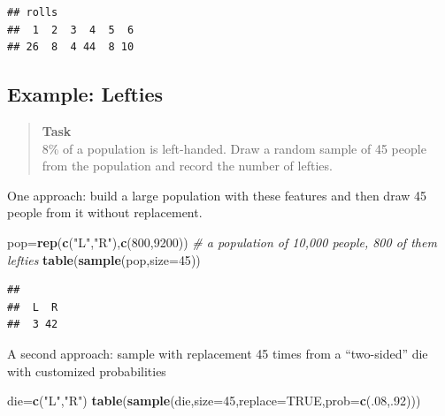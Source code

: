 \documentclass[
]{book}
\newenvironment{Shaded}{\begin{snugshade}}{\end{snugshade}}
\newcommand{\AttributeTok}[1]{\textcolor[rgb]{0.13,0.29,0.53}{#1}}
\newcommand{\CommentTok}[1]{\textcolor[rgb]{0.56,0.35,0.01}{\textit{#1}}}
\newcommand{\ConstantTok}[1]{\textcolor[rgb]{0.56,0.35,0.01}{#1}}
\newcommand{\DecValTok}[1]{\textcolor[rgb]{0.00,0.00,0.81}{#1}}
\newcommand{\FunctionTok}[1]{\textcolor[rgb]{0.13,0.29,0.53}{\textbf{#1}}}
\newcommand{\NormalTok}[1]{#1}
\newcommand{\OtherTok}[1]{\textcolor[rgb]{0.56,0.35,0.01}{#1}}
\newcommand{\StringTok}[1]{\textcolor[rgb]{0.31,0.60,0.02}{#1}}
\theoremstyle{definition}
\theoremstyle{definition}
\theoremstyle{definition}
\theoremstyle{definition}
\theoremstyle{remark}
\begin{document}
\begin{verbatim}
## rolls
##  1  2  3  4  5  6 
## 26  8  4 44  8 10
\end{verbatim}

\subsection*{Example: Lefties}\label{example-lefties}

\begin{quote}
\textbf{Task}\\
8\% of a population is left-handed. Draw a random sample of 45 people from the population and record the number of lefties.
\end{quote}

One approach: build a large population with these features and then draw 45 people from it without replacement.

\begin{Shaded}
\begin{Highlighting}[]
\NormalTok{pop}\OtherTok{=}\FunctionTok{rep}\NormalTok{(}\FunctionTok{c}\NormalTok{(}\StringTok{"L"}\NormalTok{,}\StringTok{"R"}\NormalTok{),}\FunctionTok{c}\NormalTok{(}\DecValTok{800}\NormalTok{,}\DecValTok{9200}\NormalTok{)) }\CommentTok{\# a population of 10,000 people, 800 of them lefties}
\FunctionTok{table}\NormalTok{(}\FunctionTok{sample}\NormalTok{(pop,}\AttributeTok{size=}\DecValTok{45}\NormalTok{)) }
\end{Highlighting}
\end{Shaded}

\begin{verbatim}
## 
##  L  R 
##  3 42
\end{verbatim}

A second approach: sample with replacement 45 times from a ``two-sided'' die with customized probabilities

\begin{Shaded}
\begin{Highlighting}[]
\NormalTok{die}\OtherTok{=}\FunctionTok{c}\NormalTok{(}\StringTok{"L"}\NormalTok{,}\StringTok{"R"}\NormalTok{)}
\FunctionTok{table}\NormalTok{(}\FunctionTok{sample}\NormalTok{(die,}\AttributeTok{size=}\DecValTok{45}\NormalTok{,}\AttributeTok{replace=}\ConstantTok{TRUE}\NormalTok{,}\AttributeTok{prob=}\FunctionTok{c}\NormalTok{(.}\DecValTok{08}\NormalTok{,.}\DecValTok{92}\NormalTok{)))}
\end{Highlighting}
\end{Shaded}
\end{document}
